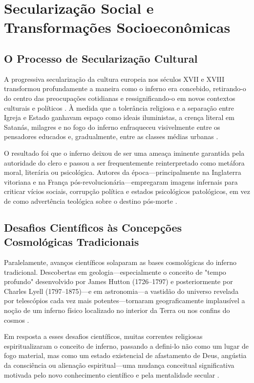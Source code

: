 \section{Secularização Social e Transformações Socioeconômicas}

\subsection{O Processo de Secularização Cultural}

A progressiva secularização da cultura europeia nos séculos XVII e XVIII transformou profundamente a maneira como o inferno era concebido, retirando-o do centro das preocupações cotidianas e ressignificando-o em novos contextos culturais e políticos \cite{Taylor2007}. À medida que a tolerância religiosa e a separação entre Igreja e Estado ganhavam espaço como ideais iluministas, a crença literal em Satanás, milagres e no fogo do inferno enfraqueceu visivelmente entre os pensadores educados e, gradualmente, entre as classes médias urbanas \cite{Chadwick1975}.

O resultado foi que o inferno deixou de ser uma ameaça iminente garantida pela autoridade do clero e passou a ser frequentemente reinterpretado como metáfora moral, literária ou psicológica. Autores da época---principalmente na Inglaterra vitoriana e na França pós-revolucionária---empregaram imagens infernais para criticar vícios sociais, corrupção política e estados psicológicos patológicos, em vez de como advertência teológica sobre o destino pós-morte \cite{Wheeler1990}.

\subsection{Desafios Científicos às Concepções Cosmológicas Tradicionais}

Paralelamente, avanços científicos solaparam as bases cosmológicas do inferno tradicional. Descobertas em geologia---especialmente o conceito de "tempo profundo" desenvolvido por James Hutton (1726--1797) e posteriormente por Charles Lyell (1797--1875)---e em astronomia---a vastidão do universo revelada por telescópios cada vez mais potentes---tornaram geograficamente implausível a noção de um inferno físico localizado no interior da Terra ou nos confins do cosmos \cite{Rudwick2005}.

Em resposta a esses desafios científicos, muitas correntes religiosas espiritualizaram o conceito de inferno, passando a defini-lo não como um lugar de fogo material, mas como um estado existencial de afastamento de Deus, angústia da consciência ou alienação espiritual---uma mudança conceitual significativa motivada pelo novo conhecimento científico e pela mentalidade secular \cite{Rowell1974}.

